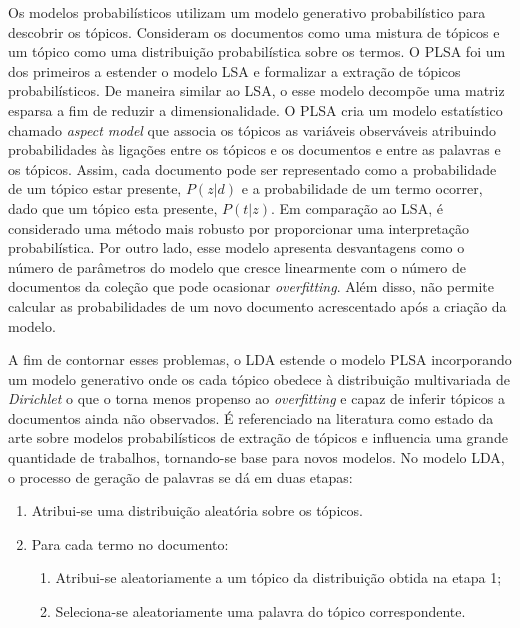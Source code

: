 Os modelos probabilísticos utilizam um modelo generativo probabilístico para descobrir os tópicos. Consideram os documentos como uma mistura de tópicos e um tópico como uma distribuição probabilística sobre os termos.
% 
O PLSA foi um dos primeiros a estender o modelo LSA e formalizar a extração de tópicos probabilísticos. De maneira similar ao LSA, o esse modelo decompõe uma matriz esparsa a fim de reduzir a dimensionalidade. O PLSA cria um modelo estatístico chamado \textit{aspect model} que associa os tópicos as variáveis observáveis atribuindo probabilidades às ligações entre os tópicos e os documentos e entre as palavras e os tópicos. Assim, cada documento pode ser representado como a probabilidade de um tópico estar presente, $P(z|d)$ e a probabilidade de um termo ocorrer, dado que um tópico esta presente, $P(t|z)$. Em comparação ao LSA, é considerado uma método mais robusto por proporcionar uma interpretação probabilística. Por outro lado, esse modelo apresenta desvantagens como o número de parâmetros do modelo que cresce linearmente com o número de documentos da coleção que pode ocasionar \textit{overfitting}. Além disso, não permite calcular as probabilidades de um novo documento acrescentado após a criação da modelo.  %

A fim de contornar esses problemas, o LDA estende o modelo PLSA incorporando um modelo generativo onde os cada tópico obedece à distribuição multivariada de \textit{Dirichlet} o que o torna menos propenso ao \textit{overfitting} e capaz de inferir tópicos a documentos ainda não observados. É referenciado na literatura como estado da arte sobre modelos probabilísticos de extração de tópicos e influencia uma grande quantidade de trabalhos, tornando-se base para novos modelos. No modelo LDA, o processo de geração de palavras se dá em duas etapas:

\begin{enumerate}
	\item Atribui-se uma distribuição aleatória sobre os tópicos.
	\item Para cada termo no documento:
		\begin{enumerate}
			\item Atribui-se aleatoriamente a um tópico da distribuição obtida na etapa 1;
			\item Seleciona-se aleatoriamente uma palavra do tópico correspondente.
		\end{enumerate}
\end{enumerate}


